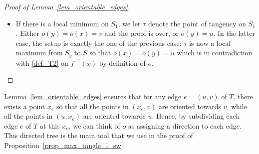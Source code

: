 \documentclass[11pt,a4paper]{article}
\newcommand\ens[1]{\left\{ #1 \right\}}
\newcommand{\T}{\mathcal{T}}
\begin{document}
\begin{proof}[Proof of Lemma~\ref{lem_orientable_edges}]
\begin{itemize}
Let $g$ be the connected component of $G \cap I$ containing $\tau$. Because $S$ and $G$ are transverse, $g \cap S$ is either a closed disk if $\tau$ belongs to a ball, a point if $\tau$ is a degree one vertex, or two points otherwise. Let us choose $D$ a closed disk on $S$ containing $g \cap S$ on its interior and disjoint from $G$ otherwise. We can now define $B$, a closed ball contained in $I$ intersecting $S$ on $D$, $S'$ on a disk, and containing $g$ in its interior (see Figure \ref{pic_orient_1}). Then $B$ is $G$-trivial. Indeed, either $\tau$ is the point of a ``V'' shape and $B \smallsetminus G$ is homeomorphic to $B(0,1) \smallsetminus [-1,1] \times \ens{(0,0)}$, or $B \smallsetminus G$ is homeomorphic to $B(0,1) \smallsetminus [-1,0]\times \ens{(0,0)}$ in the other cases (up to homeomorphism of $B \smallsetminus G$ the thickness of $g$ here does not matter, it can be a point or a segment or a closed ball). Furthermore, $B$ is by definition transverse to $G$ so that by \ref{def_T3}, $B \cup B_1$ belongs to $\T$.

At this stage,  the space $I \smallsetminus (B \cup G)$ is homeomorphic to $S_k \times [0,1]$ so that we can use a similar technique as in the proof of Lemma~\ref{lem_braid_equi} to deal with the other elements of $G$ in $I$ and cover what remains with balls disjoint from $B$, we apply~\ref{def_T3} inductively and conclude that $f^{-1} (y)$ belongs to $\T$.

\item If there is a local minimum on $S_1$, we let $\tau$ denote the point of tangency on $S_1$. Either $o(y) = o(x) = v$ and the proof is over, or $o(y) = u$. In the latter case, the setup is exactly the one of the previous case: $\tau$ is now a local maximum from $S_y$ to $S$ so that $o(x) = o(y) = u$ which is in contradiction with \ref{def_T2} on $f ^{-1}(x)$ by definition of $o$. 
\end{itemize}
\end{proof}


Lemma~\ref{lem_orientable_edges} ensures that for any edge $e=(u,v)$ of $T$, there exists a point $x_e$ so that all the points in $(x_e,v)$ are oriented towards $v$, while all the points in $(u,x_e)$ are oriented towards $u$. Hence, by subdividing each edge $e$ of $T$ at this $x_e$, we can think of $o$ as assigning a direction to each edge.
This directed tree is the main tool that we use in the proof of Proposition~\ref{prop_max_tangle_l_sw}.
\end{document}
